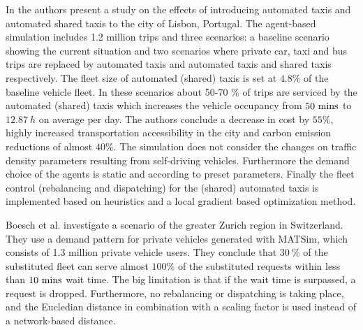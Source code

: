In \cite{martinez2017assessing} the authors present a study on the effects of
introducing automated taxis and automated shared taxis to the city of Lisbon,
Portugal. The agent-based simulation includes 1.2 million trips and three scenarios:
a baseline scenario showing the current situation and two scenarios where private car,
taxi and bus trips are replaced by automated taxis and automated taxis and shared
taxis respectively. The fleet size of automated (shared) taxis is set at $4.8\%$ of
the baseline vehicle fleet. In these scenarios about 50-70 \% of trips are serviced
by the automated (shared) taxis which increases the vehicle occupancy
from $50 ~ \textnormal{mins}$ to $12.87 ~ h$ on average per day. The authors conclude
a decrease in cost by $55 \%$, highly increased transportation
accessibility in the city and carbon emission reductions of almost $40\%$. The
simulation does not consider the changes on traffic density parameters resulting
from self-driving vehicles. Furthermore the demand choice of the agents is static
and according to preset parameters. Finally the fleet control (rebalancing and dispatching)
for the (shared) automated taxis is implemented based on heuristics and a local
gradient based optimization method.

Boesch et al. \cite{boesch2016autonomous} investigate a scenario of the greater
Zurich region in Switzerland. They use a demand pattern for private vehicles
generated with MATSim, which consists of 1.3 million private vehicle users.
They conclude that $30 ~ \%$ of the substituted fleet can serve almost $100 \%$ of the substituted
requests within less than $10 ~ \textnormal{mins}$ wait time. The big limitation
is that if the wait time is surpassed, a request is dropped. Furthermore, no rebalancing
or dispatching is taking place, and the Eucledian distance in combination with a scaling factor is
used instead of a network-based distance. %

